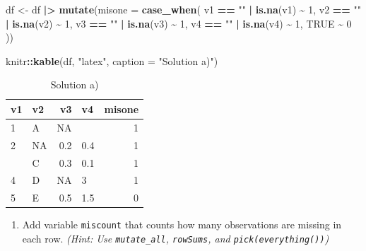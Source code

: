 \documentclass[
  doc]{apa6}
\newenvironment{Shaded}{\begin{snugshade}}{\end{snugshade}}
\newcommand{\AttributeTok}[1]{\textcolor[rgb]{0.13,0.29,0.53}{#1}}
\newcommand{\ConstantTok}[1]{\textcolor[rgb]{0.56,0.35,0.01}{#1}}
\newcommand{\DecValTok}[1]{\textcolor[rgb]{0.00,0.00,0.81}{#1}}
\newcommand{\FunctionTok}[1]{\textcolor[rgb]{0.13,0.29,0.53}{\textbf{#1}}}
\newcommand{\NormalTok}[1]{#1}
\newcommand{\OtherTok}[1]{\textcolor[rgb]{0.56,0.35,0.01}{#1}}
\newcommand{\SpecialCharTok}[1]{\textcolor[rgb]{0.81,0.36,0.00}{\textbf{#1}}}
\newcommand{\StringTok}[1]{\textcolor[rgb]{0.31,0.60,0.02}{#1}}
\providecommand{\tightlist}{%
  \setlength{\itemsep}{0pt}\setlength{\parskip}{0pt}}
\begin{document}
\begin{Shaded}
\begin{Highlighting}[]
\NormalTok{df }\OtherTok{\textless{}{-}}\NormalTok{ df }\SpecialCharTok{|\textgreater{}} 
  \FunctionTok{mutate}\NormalTok{(}\AttributeTok{misone =} \FunctionTok{case\_when}\NormalTok{(}
\NormalTok{    v1 }\SpecialCharTok{==} \StringTok{""} \SpecialCharTok{|} \FunctionTok{is.na}\NormalTok{(v1) }\SpecialCharTok{\textasciitilde{}} \DecValTok{1}\NormalTok{,}
\NormalTok{    v2 }\SpecialCharTok{==} \StringTok{""} \SpecialCharTok{|} \FunctionTok{is.na}\NormalTok{(v2) }\SpecialCharTok{\textasciitilde{}} \DecValTok{1}\NormalTok{,}
\NormalTok{    v3 }\SpecialCharTok{==} \StringTok{""} \SpecialCharTok{|} \FunctionTok{is.na}\NormalTok{(v3) }\SpecialCharTok{\textasciitilde{}} \DecValTok{1}\NormalTok{,}
\NormalTok{    v4 }\SpecialCharTok{==} \StringTok{""} \SpecialCharTok{|} \FunctionTok{is.na}\NormalTok{(v4) }\SpecialCharTok{\textasciitilde{}} \DecValTok{1}\NormalTok{,}
    \ConstantTok{TRUE} \SpecialCharTok{\textasciitilde{}} \DecValTok{0} 
\NormalTok{  ))}

\NormalTok{knitr}\SpecialCharTok{::}\FunctionTok{kable}\NormalTok{(df, }\StringTok{"latex"}\NormalTok{, }\AttributeTok{caption =} \StringTok{"Solution a)"}\NormalTok{)}
\end{Highlighting}
\end{Shaded}

\begin{table}

\caption{\label{tab:unnamed-chunk-2}Solution a)}
\centering
\begin{tabular}[t]{l|l|r|l|r}
\hline
v1 & v2 & v3 & v4 & misone\\
\hline
1 & A & NA &  & 1\\
\hline
2 & NA & 0.2 & 0.4 & 1\\
\hline
 & C & 0.3 & 0.1 & 1\\
\hline
4 & D & NA & 3 & 1\\
\hline
5 & E & 0.5 & 1.5 & 0\\
\hline
\end{tabular}
\end{table}

\newpage

\begin{enumerate}
\def\labelenumi{\alph{enumi})}
\setcounter{enumi}{1}
\tightlist
\item
  Add variable \texttt{miscount} that counts how many observations are missing in each row.
  \emph{(Hint: Use \texttt{mutate\_all}, \texttt{rowSums}, and \texttt{pick(everything())})}
\end{enumerate}
\end{document}
